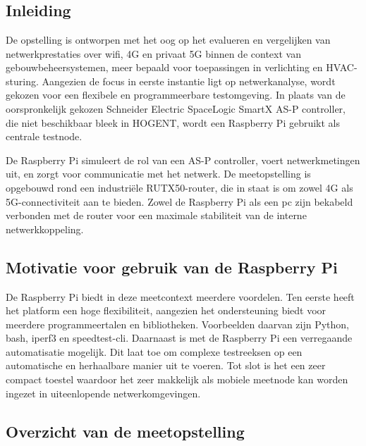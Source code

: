 \chapter{}%
\label{ch:basisopstelling}

\section{Inleiding}

De opstelling is ontworpen met het oog op het evalueren en vergelijken van netwerkprestaties over wifi, 4G en privaat 5G binnen de context van gebouwbeheersystemen, meer bepaald voor toepassingen in verlichting en HVAC-sturing.
Aangezien de focus in eerste instantie ligt op netwerkanalyse, wordt gekozen voor een flexibele en programmeerbare testomgeving. In plaats van de oorspronkelijk gekozen Schneider Electric SpaceLogic SmartX AS-P controller, die niet beschikbaar bleek in HOGENT, wordt een Raspberry Pi gebruikt als centrale testnode.

De Raspberry Pi simuleert de rol van een AS-P controller,  voert netwerkmetingen uit, en zorgt voor communicatie met het netwerk. De meetopstelling is opgebouwd rond een industriële RUTX50-router, die in staat is om zowel 4G als 5G-connectiviteit aan te bieden. Zowel de Raspberry Pi als een pc zijn bekabeld verbonden met de router voor een maximale stabiliteit van de interne netwerkkoppeling.


\section{Motivatie voor gebruik van de Raspberry Pi}

De Raspberry Pi biedt in deze meetcontext meerdere voordelen. Ten eerste heeft het platform een hoge flexibiliteit, aangezien het ondersteuning biedt voor meerdere programmeertalen en bibliotheken. Voorbeelden daarvan zijn Python, bash, iperf3 en speedtest-cli. Daarnaast is met de Raspberry Pi een verregaande automatisatie mogelijk. Dit laat toe om complexe testreeksen op een automatische en herhaalbare manier uit te voeren. Tot slot is het een zeer compact toestel waardoor het zeer makkelijk als mobiele meetnode kan worden ingezet in uiteenlopende netwerkomgevingen.


\section{Overzicht van de meetopstelling}


